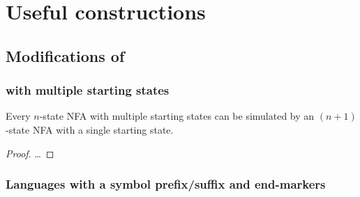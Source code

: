 \chapter{Useful constructions}

\section{Modifications of \NFAs}

\subsection{\NFAs with multiple starting states}
\begin{thrm}
	Every $n$-state NFA with multiple starting states can be simulated by an $(n+1)$-state NFA with a single starting state.
\end{thrm}
\begin{proof}
	\dots
\end{proof}

\subsection{Languages with a symbol prefix/suffix and end-markers}
